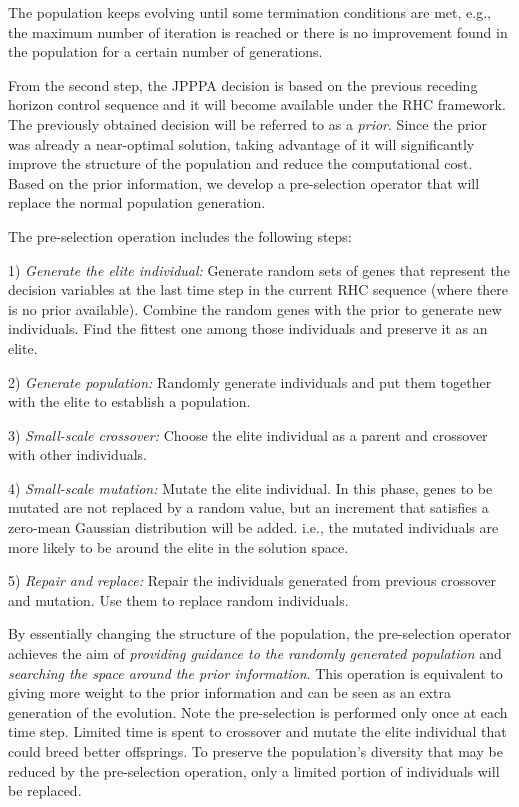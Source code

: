 \documentclass[12pt,journal,draftclsnofoot,onecolumn]{IEEEtran}
\begin{document}
The population keeps evolving until some termination conditions are met, e.g., the maximum number of iteration is reached or there is no improvement found in the population for a certain number of generations.

From the second step, the JPPPA decision is based on the previous receding horizon control sequence and it will become available under the RHC framework. The previously obtained decision will be referred to as a \emph{prior}. Since the prior was already a near-optimal solution, taking advantage of it will significantly improve the structure of the population and reduce the computational cost.
Based on the prior information, we develop a pre-selection operator that will replace the normal population generation.

The pre-selection operation includes the following steps:

1) \emph{Generate the elite individual:} Generate random sets of genes that represent the decision variables at the last time step in the current RHC sequence (where there is no prior available). Combine the random genes with the prior to generate new individuals. Find the fittest one among those individuals and preserve it as an elite.

2) \emph{Generate population:} Randomly generate individuals and put them together with the elite to establish a population.

3) \emph{Small-scale crossover:} Choose the elite individual as a parent and crossover with other individuals.

4) \emph{Small-scale mutation:} Mutate the elite individual. In this phase, genes to be mutated are not replaced by a random value, but an increment that satisfies a zero-mean Gaussian distribution will be added. i.e., the mutated individuals are more likely to be around the elite in the solution space.

5) \emph{Repair and replace:} Repair the individuals generated from previous crossover and mutation. Use them to replace random individuals.

By essentially changing the structure of the population, the pre-selection operator achieves the aim of \emph{providing guidance to the randomly generated population} and \emph{searching the space around the prior information}. This operation is equivalent to giving more weight to the prior information and can be seen as an extra generation of the evolution. Note the pre-selection is performed only once at each time step. Limited time is spent to crossover and mutate the elite individual that could breed better offsprings. To preserve the population's diversity that may be reduced by the pre-selection operation, only a limited portion of individuals will be replaced. 
\end{document}
